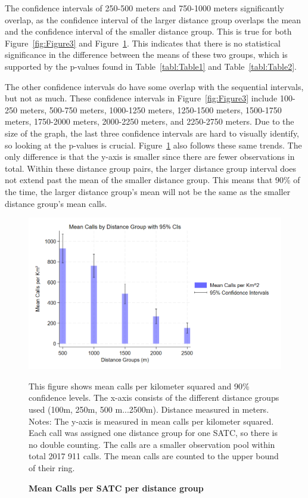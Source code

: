 \documentclass[12pt]{article}
\begin{document}
The confidence intervals of 250-500 meters and 750-1000 meters significantly overlap, as the confidence interval of the larger distance group overlaps the mean and the confidence interval of the smaller distance group. This is true for both Figure~\ref{fig:Figure3} and Figure~\ref{fig:Figure4}. This indicates that there is no statistical significance in the difference between the means of these two groups, which is supported by the p-values found in Table~\ref{tabl:Table1} and Table~\ref{tabl:Table2}. 

The other confidence intervals do have some overlap with the sequential intervals, but not as much. These confidence intervals in Figure~\ref{fig:Figure3} include 100-250 meters, 500-750 meters, 1000-1250 meters, 1250-1500 meters, 1500-1750 meters, 1750-2000 meters, 2000-2250 meters, and 2250-2750 meters. Due to the size of the graph, the last three confidence intervals are hard to visually identify, so looking at the p-values is crucial. Figure~\ref{fig:Figure4} also follows these same trends. The only difference is that the y-axis is smaller since there are fewer observations in total. Within these distance group pairs, the larger distance group interval does not extend past the mean of the smaller distance group. This means that 90\% of the time, the larger distance group's mean will not be the same as the smaller distance group's mean calls. 
\begin{figure}[htbp]
    \centering
\includegraphics[width=0.75\linewidth]{Reproducibility Package/Downloaded_calls/Visual_Graphics_Downloaded_calls/500_CI_Graph.png}
    \caption{\textbf{Mean Calls per SATC per distance group}}
    \label{fig:Figure4}
       {This figure shows mean calls per kilometer squared and 90\% confidence levels. The x-axis consists of the different distance groups used (100m, 250m, 500 m...2500m). Distance measured in meters.}
    \centering\small{Notes: The y-axis is measured in mean calls per kilometer squared. Each call was assigned one distance group for one SATC, so there is no double counting. The calls are a smaller observation pool within total 2017 911 calls. The mean calls are counted to the upper bound of their ring.}
\end{figure}
\end{document}
